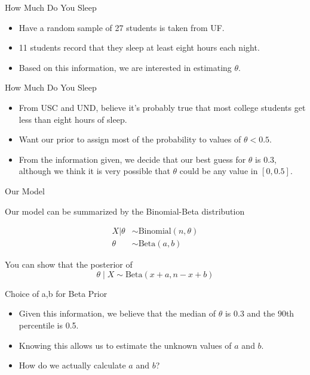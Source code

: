 \documentclass[
  ignorenonframetext,
]{beamer}
\begin{document}
\begin{frame}{How Much Do You Sleep}
\protect\hypertarget{how-much-do-you-sleep}{}

\begin{itemize}
\item  Have a random sample of 27 students is taken from UF. 
\item 11 students record that they sleep at least eight hours each night. 
\item Based on this information, we are interested in estimating $\theta.$ 
\end{itemize}

\end{frame}

\begin{frame}{How Much Do You Sleep}
\protect\hypertarget{how-much-do-you-sleep-1}{}

\begin{itemize}
\item From USC and UND,  believe it's probably true that most college students get less than eight hours of sleep. 
\item Want our prior to assign most of the probability to values of $\theta < 0.5. $
\item From the information given, we decide that our best guess for $\theta$ is 0.3, although we think it is very possible that $\theta$ could be any value in $[0,0.5].$
\end{itemize}

\end{frame}

\begin{frame}{Our Model}
\protect\hypertarget{our-model}{}

Our model can be summarized by the Binomial-Beta distribution

\begin{align}
X|\theta &\sim \text{Binomial} (n, \theta) \\
\theta &\sim \text{Beta}(a,b) 
\end{align}

You can show that the posterior of
\[\theta \mid X \sim \text{Beta}(x+a,n-x+b)\]

\end{frame}

\begin{frame}{Choice of a,b for Beta Prior}
\protect\hypertarget{choice-of-ab-for-beta-prior}{}

\begin{itemize}
\item Given this information, we believe that the median of $\theta$ is $0.3$ and the $90$th percentile is 0.5. 
\item Knowing this allows us to estimate the unknown values of $a$ and $b$. 
\item How do we actually calculate $a$ and $b$?
\end{itemize}

\end{frame}
\end{document}
